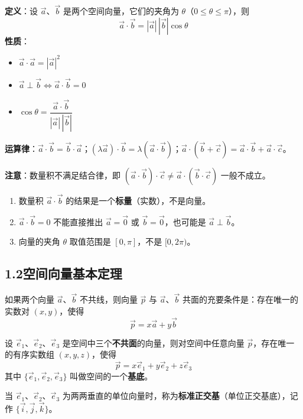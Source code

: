 \documentclass[12pt, a4paper]{ctexart}
\begin{document}
\begin{knowledgebox}[空间向量的数量积]
\textbf{定义}：设 $\vec{a}$、$\vec{b}$ 是两个空间向量，它们的夹角为 $\theta$（$0\le\theta\le\pi$），则
\[
\vec{a}\cdot\vec{b}=|\vec{a}|\,|\vec{b}|\cos\theta
\]
\textbf{性质}：
\begin{itemize}[nosep]
  \item $\vec{a}\cdot\vec{a}=|\vec{a}|^2$
  \item $\vec{a}\perp\vec{b}\iff\vec{a}\cdot\vec{b}=0$
  \item $\cos\theta=\dfrac{\vec{a}\cdot\vec{b}}{|\vec{a}|\,|\vec{b}|}$
\end{itemize}
\textbf{运算律}：$\vec{a}\cdot\vec{b}=\vec{b}\cdot\vec{a}$；$(\lambda\vec{a})\cdot\vec{b}=\lambda(\vec{a}\cdot\vec{b})$；$\vec{a}\cdot(\vec{b}+\vec{c})=\vec{a}\cdot\vec{b}+\vec{a}\cdot\vec{c}$。

\textbf{注意}：数量积不满足结合律，即 $(\vec{a}\cdot\vec{b})\cdot\vec{c}\ne\vec{a}\cdot(\vec{b}\cdot\vec{c})$ 一般不成立。
\end{knowledgebox}

\begin{warnbox}[易错提醒]
\begin{enumerate}[nosep]
  \item 数量积 $\vec{a}\cdot\vec{b}$ 的结果是一个\textbf{标量}（实数），不是向量。
  \item $\vec{a}\cdot\vec{b}=0$ 不能直接推出 $\vec{a}=\vec{0}$ 或 $\vec{b}=\vec{0}$，也可能是 $\vec{a}\perp\vec{b}$。
  \item 向量的夹角 $\theta$ 取值范围是 $[0,\pi]$，不是 $[0,2\pi)$。
\end{enumerate}
\end{warnbox}

\subsection*{1.2\quad 空间向量基本定理}

\begin{knowledgebox}[共面向量定理]
如果两个向量 $\vec{a}$、$\vec{b}$ 不共线，则向量 $\vec{p}$ 与 $\vec{a}$、$\vec{b}$ 共面的充要条件是：存在唯一的实数对 $(x,y)$，使得
\[
\vec{p}=x\vec{a}+y\vec{b}
\]
\end{knowledgebox}

\begin{knowledgebox}[空间向量基本定理]
设 $\vec{e}_1$、$\vec{e}_2$、$\vec{e}_3$ 是空间中三个\textbf{不共面}的向量，则对空间中任意向量 $\vec{p}$，存在唯一的有序实数组 $(x,y,z)$，使得
\[
\vec{p}=x\vec{e}_1+y\vec{e}_2+z\vec{e}_3
\]
其中 $\{\vec{e}_1,\vec{e}_2,\vec{e}_3\}$ 叫做空间的一个\textbf{基底}。

当 $\vec{e}_1$、$\vec{e}_2$、$\vec{e}_3$ 为两两垂直的单位向量时，称为\textbf{标准正交基}（单位正交基底），记作 $\{\vec{i},\vec{j},\vec{k}\}$。
\end{knowledgebox}
\end{document}
